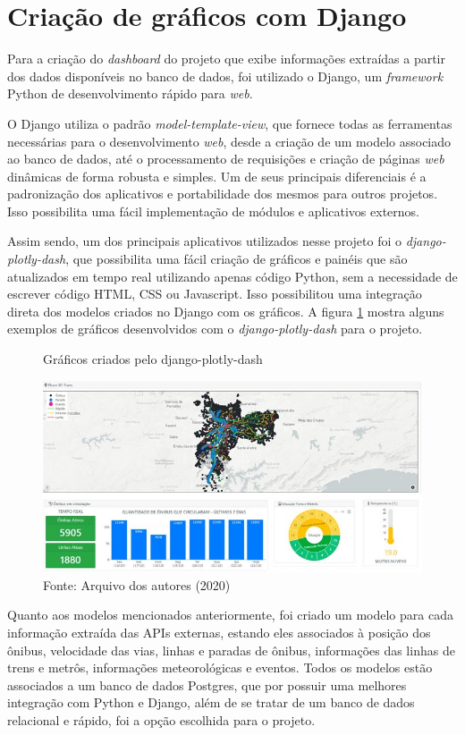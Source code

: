 \section{Criação de gráficos com Django}
\indent
\par Para a criação do \textit{dashboard} do projeto que exibe informações extraídas a partir dos dados disponíveis no banco de dados, foi utilizado o Django, um \textit{framework} Python de desenvolvimento rápido para \textit{web}.
\indent
\par O Django utiliza o padrão \textit{model-template-view}, que fornece todas as ferramentas necessárias para o desenvolvimento \textit{web}, desde a criação de um modelo associado ao banco de dados, até o processamento de requisições e criação de páginas \textit{web} dinâmicas de forma robusta e simples. Um de seus principais diferenciais é a padronização dos aplicativos e portabilidade dos mesmos para outros projetos. Isso possibilita uma fácil implementação de módulos e aplicativos externos.
\indent
\par Assim sendo, um dos principais aplicativos utilizados nesse projeto foi o \textit{django-plotly-dash}, que possibilita uma fácil criação de gráficos e painéis que são atualizados em tempo real utilizando apenas código Python, sem a necessidade de escrever código HTML, CSS ou Javascript. Isso possibilitou uma integração direta dos modelos criados no Django com os gráficos. A figura \ref{printDashboard} mostra alguns exemplos de gráficos desenvolvidos com o \textit{django-plotly-dash} para o projeto.

\begin{figure}[H]
    \centering
    \caption{Gráficos criados pelo django-plotly-dash}
    \includegraphics[width=1.0\linewidth]{Imagens/printDashboard.jpeg}
    \caption*{Fonte: Arquivo dos autores (2020)}
    \label{printDashboard}
\end{figure}
\indent
\par Quanto aos modelos mencionados anteriormente, foi criado um modelo para cada informação extraída das APIs externas, estando eles associados à posição dos ônibus, velocidade das vias, linhas e paradas de ônibus, informações das linhas de trens e metrôs, informações meteorológicas e eventos. Todos os modelos estão associados a um banco de dados Postgres, que por possuir uma melhores integração com Python e Django, além de se tratar de um banco de dados relacional e rápido, foi a opção escolhida para o projeto.

